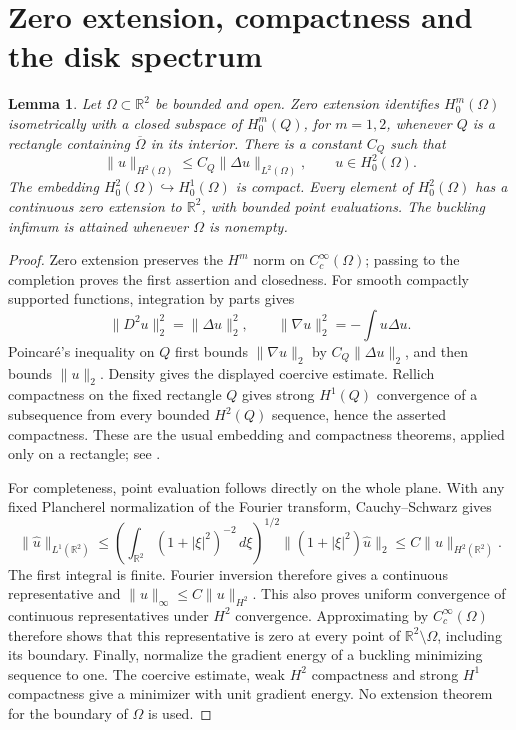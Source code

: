 \documentclass[11pt]{article}
\newtheorem{lemma}[theorem]{Lemma}
\theoremstyle{remark}
\begin{document}
\section{Zero extension, compactness and the disk spectrum}

\begin{lemma}\label{app:formfacts}
Let $\Omega\subset\mathbb R^2$ be bounded and open. Zero extension
identifies $H_0^m(\Omega)$ isometrically with a closed subspace of
$H_0^m(Q)$, for $m=1,2$, whenever $Q$ is a rectangle containing
$\overline\Omega$ in its interior. There is a constant $C_Q$ such that
\[
 \|u\|_{H^2(\Omega)}\le C_Q\|\Delta u\|_{L^2(\Omega)},
 \qquad u\in H_0^2(\Omega).
\]
The embedding $H_0^2(\Omega)\hookrightarrow H_0^1(\Omega)$ is compact.
Every element of $H_0^2(\Omega)$ has a continuous zero extension to
$\mathbb R^2$, with bounded point evaluations. The buckling infimum is attained whenever $\Omega$ is nonempty.
\end{lemma}
\begin{proof}
Zero extension preserves the $H^m$ norm on $C_c^\infty(\Omega)$;
passing to the completion proves the first assertion and closedness.
For smooth compactly supported functions, integration by parts gives
\[
 \|D^2u\|_2^2=\|\Delta u\|_2^2,\qquad
 \|\nabla u\|_2^2=-\int u\Delta u.
\]
Poincar\'e's inequality on $Q$ first bounds $\|\nabla u\|_2$ by
$C_Q\|\Delta u\|_2$, and then bounds $\|u\|_2$. Density gives the
displayed coercive estimate. Rellich compactness on the fixed
rectangle $Q$ gives strong $H^1(Q)$ convergence of a subsequence
from every bounded $H^2(Q)$ sequence, hence the asserted compactness.
These are the usual embedding and compactness theorems, applied only
on a rectangle; see \cite[Chapters~4 and~6]{AF}.

For completeness, point evaluation follows directly on the whole
plane. With any fixed Plancherel normalization of the Fourier
transform, Cauchy--Schwarz gives
\[
 \|\widehat u\|_{L^1(\mathbb R^2)}
 \le\left(\int_{\mathbb R^2}(1+|\xi|^2)^{-2}\,d\xi\right)^{1/2}
       \|(1+|\xi|^2)\widehat u\|_2
 \le C\|u\|_{H^2(\mathbb R^2)}.
\]
The first integral is finite. Fourier inversion therefore gives a
continuous representative and $\|u\|_\infty\le C\|u\|_{H^2}$.
This also proves uniform convergence of continuous representatives
under $H^2$ convergence. Approximating by $C_c^\infty(\Omega)$
therefore shows that this representative is zero at every point
of $\mathbb R^2\setminus\Omega$, including its boundary.
Finally, normalize the gradient energy of
a buckling minimizing sequence to one. The coercive estimate, weak
$H^2$ compactness and strong $H^1$ compactness give a minimizer with
unit gradient energy. No extension theorem for the boundary of
$\Omega$ is used.
\end{proof}
\end{document}

